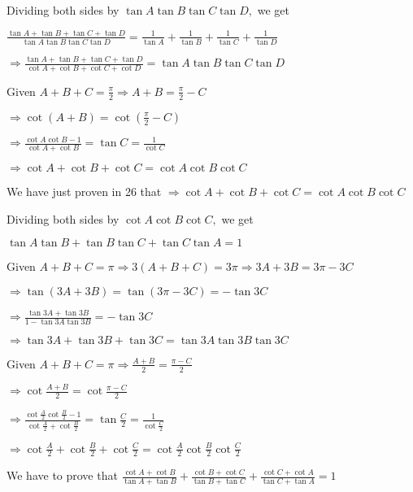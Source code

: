   Dividing both sides by $\tan A\tan B\tan C\tan D,$ we get

  $\frac{\tan A + \tan B + \tan C + \tan D}{\tan A\tan B\tan C\tan D} = \frac{1}{\tan A} + \frac{1}{\tan B} + \frac{1}{\tan
    C} + \frac{1}{\tan D}$

  $\Rightarrow \frac{\tan A + \tan B + \tan C + \tan D}{\cot A + \cot B + \cot C + \cot D} = \tan A\tan B\tan C\tan D$

\item Given $A + B + C = \frac{\pi}{2}\Rightarrow A + B = \frac{\pi}{2} - C$

  $\Rightarrow \cot(A + B) = \cot\left(\frac{\pi}{2} - C\right)$

  $\Rightarrow \frac{\cot A\cot B - 1}{\cot A + \cot B} = \tan C = \frac{1}{\cot C}$

  $\Rightarrow \cot A + \cot B + \cot C = \cot A\cot B\cot C$

\item We have just proven in 26 that $\Rightarrow \cot A + \cot B + \cot C = \cot A\cot B\cot C$

  Dividing both sides by $\cot A\cot B\cot C,$ we get

  $\tan A\tan B + \tan B\tan C + \tan C\tan A = 1$

\item Given $A + B + C = \pi \Rightarrow 3(A + B + C) = 3\pi \Rightarrow 3A + 3B = 3\pi - 3C$

  $\Rightarrow \tan(3A + 3B) = \tan(3\pi - 3C) = -\tan3C$

  $\Rightarrow \frac{\tan 3A + \tan 3B}{1 - \tan3A\tan3B} = -\tan3C$

  $\Rightarrow \tan 3A + \tan 3B + \tan 3C = \tan 3A\tan 3B\tan 3C$

\item Given $A + B + C = \pi \Rightarrow \frac{A + B}{2} = \frac{\pi - C}{2}$

  $\Rightarrow \cot\frac{A + B}{2} = \cot\frac{\pi - C}{2}$

  $\Rightarrow \frac{\cot\frac{A}{2}\cot\frac{B}{2} - 1}{\cot\frac{A}{2} + \cot\frac{B}{2}} = \tan\frac{C}{2} =
  \frac{1}{\cot\frac{C}{2}}$

  $\Rightarrow \cot \frac{A}{2} + \cot \frac{B}{2} + \cot \frac{C}{2} = \cot \frac{A}{2}\cot
  \frac{B}{2}\cot \frac{C}{2}$

\item We have to prove that $\frac{\cot A + \cot B}{\tan A + \tan B} + \frac{\cot B + \cot C}{\tan B + \tan C}
  + \frac{\cot C + \cot A}{\tan C + \tan A} = 1$

